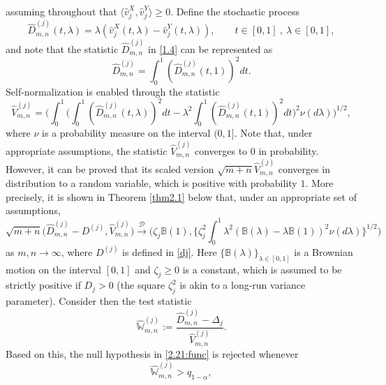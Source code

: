 \documentclass[11pt]{article}
\numberwithin{equation}{section}
\numberwithin{theorem}{section}
\numberwithin{lemma}{section}
\numberwithin{proposition}{section}
\numberwithin{cor}{section}
\numberwithin{definition}{section}
\numberwithin{cons}{section}
\numberwithin{rem}{section}
\numberwithin{exa}{section}
\numberwithin{table}{section}
\numberwithin{figure}{section}
\numberwithin{algo}{section}
\begin{document}
{{assuming throughout that $\langle \hat v^X_{j},  \hat v^Y_{j} \rangle \geq 0$. Define the stochastic process
\begin{equation}\label{2.5}
  \hat D^{(j)}_{m,n} (t, \lambda) = \lambda (\hat v^X_j (t,\lambda) - \hat v^Y_j (t,\lambda)),
  \qquad t \in [0,1]~,~\lambda \in [0,1],
\end{equation}
and note that the statistic $\hat D^{(j)}_{m,n}$ in \eqref{1.4} can be represented as
\begin{equation}\label{2.6}
  \hat D^{(j)}_{m,n} = \int^1_0 (\hat D^{(j)}_{m,n} (t,1))^2 dt.
\end{equation}
Self-normalization is enabled through the statistic
\begin{equation}\label{2.7}
  \hat V^{(j)}_{m,n} = \Big( \int^1_0 \Big( \int^1_0 (\hat D^{(j)}_{m,n} (t, \lambda))^2  dt - \lambda^2 \int^1_0 (\hat D^{(j)}_{m,n} (t,1))^2dt \Big)^2
  \nu ( d \lambda) \Big)^{1/2} ,
\end{equation}
where  $\nu $ is a probability measure on the interval $(0,1]$. Note that, under appropriate assumptions, the statistic
$  \hat V^{(j)}_{m,n} $ converges to $0$ in probability. However, it can be proved that  its scaled version  $\sqrt{m+n}   \hat V^{(j)}_{m,n} $
converges in distribution to a random variable, which is positive with probability $1$. More precisely,
it is shown in Theorem \ref{thm2.1} below that, under an appropriate set of assumptions,
\begin{equation}\label{weak}
\sqrt{m+n}
\big ( {\hat D^{(j)}_{m,n}- D^{(j)}} , {\hat V^{(j)}_{m,n}} \big  ) \stackrel{\mathcal{D}}{\longrightarrow} \Big ( \zeta_j \mathbb{B} (1),
\Big \{ \zeta_j^{2} \int^1_0 \lambda^2 (\mathbb{B}(\lambda) - \lambda \mathbb{B}(1))^{2} \nu ( d \lambda )  \Big \}^{1/2} \Big)
\end{equation}
as $m,n \to \infty$, where  $D^{(j)} $ is defined in \eqref{dj}.
{
Here  $\{ \mathbb{B} (\lambda) \}_{\lambda \in [0,1]}$ is a Brownian motion on the interval $[0,1]$ and
 $\zeta_j  \geq 0$ is a constant, which is assumed to be strictly positive  if $D_{j} >0$ (the square $\zeta_j^{2}$  is akin to a long-run variance parameter).}
Consider then the test statistic
\begin{equation}\label{2.6a}
\hat{\mathbb{W}}^{(j)}_{m,n} := \frac {\hat D^{(j)}_{m,n}- \Delta_j}{\hat V^{(j)}_{m,n}}.
\end{equation}
Based on this, the null hypothesis in \eqref{2.21:func} is rejected whenever
\begin{equation}  \label{testone}
\hat{\mathbb{W}}^{(j)}_{m,n}  > q_{1 - \alpha},

\end{equation}}}
\end{document}

